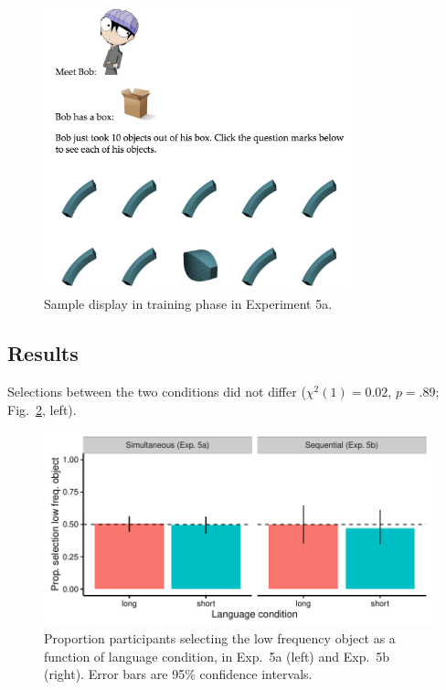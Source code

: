  \begin{figure}
 \begin{center}
  \includegraphics[width=3.5in]{figs/seqfreq_display.png}
  \caption{\label{fig:seqfreq_display} Sample display in training phase in Experiment 5a.}
 \end{center}
\end{figure}


 \subsection{Results}
 Selections between the two conditions did not differ (${\chi}^2$$(1) = 0.02$, $p = .89$; Fig.\ \ref{fig:freq_plots}, left).
 
  \begin{figure}
 \begin{center}
  \includegraphics[width=6in]{figs/freq_plots.pdf}
  \caption{\label{fig:freq_plots} Proportion participants selecting the low frequency object as a function of language condition, in Exp.\ 5a (left) and Exp.\ 5b (right). Error bars are 95\% confidence intervals.}
 \end{center}
\end{figure}



